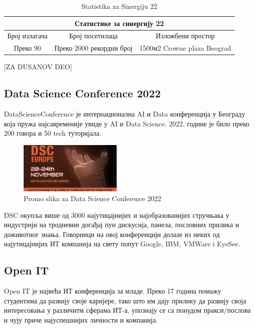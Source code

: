 \documentclass[12pt]{article}
\begin{document}
\begin{table}[h!]
\begin{center}
\begin{tabular}{|ccc|} \hline
\multicolumn{3}{|c|}{Статистике за синергију 22}                                                                  \\ \hline
\multicolumn{1}{|c|}{Број излагача} & \multicolumn{1}{c|}{Број посетилаца}          & Изложбени простор           \\ \hline
\multicolumn{1}{|c|}{Преко 90}      & \multicolumn{1}{c|}{Преко 2000 рекордни број} & 1500м2 Crowne plaza Beograd \\ \hline
\end{tabular}
\caption{Statistika za Sinergiju 22}
\label{tab:tabela1}
\end{center}
\end{table}

[ZA DUSANOV DEO]

\subsection{Data Science Conference 2022}
DataScienceConference је интернационална AI и Data конференција у Београду која пружа најсавременије увиде у AI и Data Science. 2022. године је било преко 200 говора и 50 tech туторијала. 

\begin{figure}[h!]
        \centering\includegraphics[height=2.5cm]{slike/dsc.jpg} 
        \caption{Promo slika za Data Science Conference 2022}
        \label{fig:dsc22}
\end{figure}

DSC окупља више од 3000 најутицајнијих и најобразованијих стручњака у индустрији на тродневни догађај пун дискусија, панела, пословних прилика и доживотног знања. Говорници на овој конференцији долазе из неких од најутицајнијих ИТ компанија на свету попут Google, IBM, VMWare i EyeSee.\cite{dsc}

\subsection{Open IT}
Open IT је највећа ИТ конференција за младе. Преко 17 година помажу студентима да развију своје каријере, тако што им дају прилику да развију своја интересовања у различитм сферама ИТ-а, упознају се са понудом пракси/послова и чују приче најуспешнијих личности и компанија.
\end{document}
